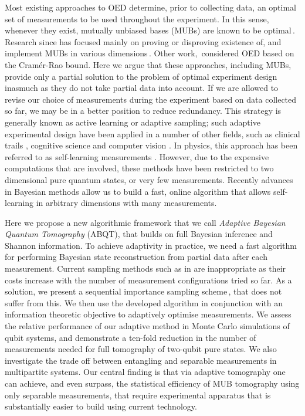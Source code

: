\documentclass[aps,twocolumn,prl]{revtex4-1}
\begin{document}
Most existing approaches to OED determine, prior to collecting data, an optimal set of measurements to be used throughout the experiment. In this sense, whenever they exist, mutually unbiased bases (MUBs) are known to be optimal\,\cite{MUBFirst,MUBExperiment}. Research since has focused mainly on proving or disproving existence of, and implement MUBs in various dimensions\,\cite{DimensionSix,MUBQutrit,MUBExperiment}. Other work,\,\cite{OEDFirst,OEDAverage} considered OED based on the Cram\'{e}r-Rao bound. Here we argue that these approaches, including MUBs, provide only a partial solution to the problem of optimal experiment design inasmuch as they do not take partial data into account. If we are allowed to revise our choice of measurements during the experiment based on data collected so far, we may be in a better position to reduce redundancy. This strategy is generally known as active learning or adaptive sampling; such adaptive experimental design have been applied in a number of other fields, such as clinical trails \cite{Berry2006}, cognitive science \cite{Cavagnaro2010} and computer vision \cite{Vondrick2011}. In physics, this approach has been referred to as self-learning measurements \cite{SelfLearning, SelfLearningExperimental}. However, due to the expensive computations that are involved, these methods have been restricted to two dimensional pure quantum states, or very few measurements. Recently advances in Bayesian methods allow us to build a fast, online algorithm that allows self-learning in arbitrary dimensions with many measurements. 

Here we propose a new algorithmic framework that we call \emph{Adaptive Bayesian Quantum Tomography} (ABQT), that builds on full Bayesian inference and Shannon information. 
To achieve adaptivity in practice, we need a fast algorithm for performing Bayesian state reconstruction from partial data after each measurement. Current sampling methods such as in \cite{BayesianTomography} are inappropriate as their costs increase with the number of measurement configurations tried so far. As a solution, we present a sequential importance sampling scheme\,\cite{SMCBook}, that does not suffer from this. We then use the developed algorithm in conjunction with an information theoretic objective to adaptively optimise measurements. We assess the relative performance of our adaptive method in Monte Carlo simulations of qubit systems, and demonstrate a ten-fold reduction in the number of measurements needed for full tomography of two-qubit pure states. We also investigate the trade off between entangling and separable measurements in multipartite systems. Our central finding is that via adaptive tomography one can achieve, and even surpass, the statistical efficiency of MUB tomography using only separable measurements, that require experimental apparatus that is substantially easier to build using current technology.
\end{document}
